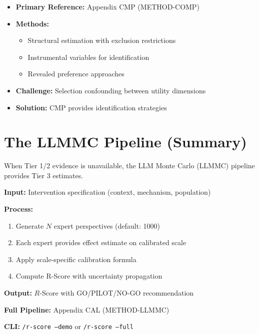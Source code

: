 \begin{itemize}[nosep]
    \item \textbf{Primary Reference:} Appendix CMP (METHOD-COMP)
    \item \textbf{Methods:}
        \begin{itemize}[nosep]
            \item Structural estimation with exclusion restrictions
            \item Instrumental variables for identification
            \item Revealed preference approaches
        \end{itemize}
    \item \textbf{Challenge:} Selection confounding between utility dimensions
    \item \textbf{Solution:} CMP provides identification strategies
\end{itemize}


\section{The LLMMC Pipeline (Summary)}
\label{sec:pm-llmmc}

When Tier 1/2 evidence is unavailable, the LLM Monte Carlo (LLMMC) pipeline provides Tier 3 estimates.

\begin{tcolorbox}[colback=blue!5!white, colframe=blue!75!black, title=LLMMC Pipeline Overview]
\textbf{Input:} Intervention specification (context, mechanism, population)

\textbf{Process:}
\begin{enumerate}[nosep]
    \item Generate $N$ expert perspectives (default: 1000)
    \item Each expert provides effect estimate on calibrated scale
    \item Apply scale-specific calibration formula
    \item Compute R-Score with uncertainty propagation
\end{enumerate}

\textbf{Output:} $R$-Score with GO/PILOT/NO-GO recommendation

\textbf{Full Pipeline:} Appendix CAL (METHOD-LLMMC)

\textbf{CLI:} \texttt{/r-score --demo} or \texttt{/r-score --full}
\end{tcolorbox}


